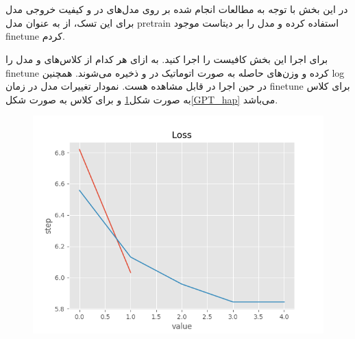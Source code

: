 \documentclass[10pt]{article}
\begin{document}
	
\newpage
\section{
}

\subsection{}
در این بخش با توجه به مطالعات انجام شده بر روی مدل‌های
 در 
و کیفیت خروجی مدل برای این تسک، از
به عنوان مدل pretrain استفاده کرده و مدل را بر دیتاست موجود finetune کردم.

برای اجرا این بخش کافیست
را اجرا کنید.
به ازای هر کدام از کلاس‌های 
و
مدل را finetune کرده و وزن‌های حاصله به صورت اتوماتیک در
و
ذخیره می‌شوند. همچنین log در حین اجرا در 
قابل مشاهده هست. نمودار تغییرات  
مدل در زمان finetune برای کلاس
 به صورت شکل\ref{GPT_dep}
 و برای کلاس
به صورت شکل\ref{GPT_hap}
می‌باشد.
	\begin{figure}[H]
		\centering\includegraphics[width=\linewidth]{../reports/loss_history_GPT2_depression.png}
		\caption{ 
			}
		\label{GPT_dep}
	\end{figure}
	
\end{document}
